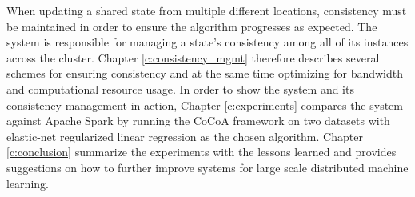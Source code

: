 When updating a shared state from multiple different locations, consistency must be maintained in order to ensure the algorithm progresses as expected. The system is responsible for managing a state's consistency among all of its instances across the cluster. Chapter \ref{c:consistency_mgmt} therefore describes several schemes for ensuring consistency and at the same time optimizing for bandwidth and computational resource usage.
In order to show the system and its consistency management in action, Chapter \ref{c:experiments} compares the system against Apache Spark by running the CoCoA framework on two datasets with elastic-net regularized linear regression as the chosen algorithm.
Chapter \ref{c:conclusion} summarize the experiments with the lessons learned and provides suggestions on how to further improve systems for large scale distributed machine learning.
